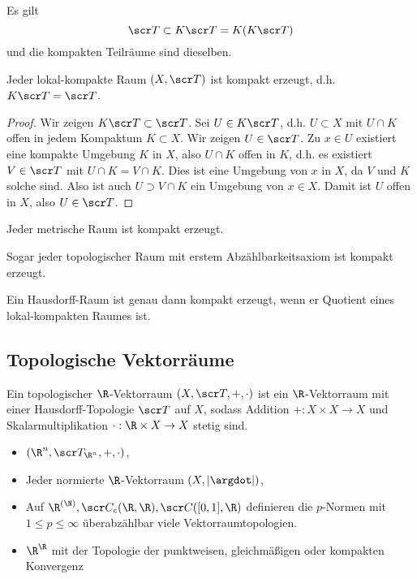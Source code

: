 \begin{lem}
	Es gilt
	\[
		\scr T \subset K \scr T = K(K \scr T)
	\]
	und die kompakten Teilräume sind dieselben.
\end{lem}

\begin{st}
	Jeder lokal-kompakte Raum $(X, \scr T)$ ist kompakt erzeugt, d.h. $K \scr T = \scr T$.
	\begin{proof}
		Wir zeigen $K \scr T \subset \scr T$.
		Sei $U \in K \scr T$, d.h. $U \subset X$ mit $U \cap K$ offen in jedem Kompaktum $K \subset X$.
		Wir zeigen $U \in \scr T$.
		Zu $x \in U$ existiert eine kompakte Umgebung $K$ in $X$, also $U \cap K$ offen in $K$, d.h. es existiert $V \in \scr T$ mit $U \cap K = V \cap K$.
		Dies ist eine Umgebung von $x$ in $X$, da $V$ und $K$ solche sind.
		Also ist auch $U \supset V \cap K$ ein Umgebung von $x \in X$.
		Damit ist $U$ offen in $X$, also $U \in \scr T$.
	\end{proof}
\end{st}


\begin{st}
	Jeder metrische Raum ist kompakt erzeugt.

	Sogar jeder topologischer Raum mit erstem Abzählbarkeitsaxiom ist kompakt erzeugt.
\end{st}

\begin{st}
	Ein Hausdorff-Raum ist genau dann kompakt erzeugt, wenn er Quotient eines lokal-kompakten Raumes ist.
\end{st}

\subsection{Topologische Vektorräume}

\begin{df}
	Ein topologischer $\R$-Vektorraum $(X, \scr T, +, \cdot)$ ist ein $\R$-Vektorraum mit einer Hausdorff-Topologie $\scr T$ auf $X$, sodass Addition $+: X\times X \to X$ und Skalarmultiplikation $\cdot: \R \times X \to X$ stetig sind.
\end{df}

\begin{ex}
	\begin{itemize}
		\item
			$(\R^n, \scr T_{\R^n}, +, \cdot)$,
		\item
			Jeder normierte $\R$-Vektorraum $(X,|\argdot|)$,
		\item
			Auf $\R^{(\N)}, \scr C_c(\R,\R), \scr C([0,1],\R)$ definieren die $p$-Normen mit $1 \le p \le \infty$ überabzählbar viele Vektorraumtopologien.
		\item
			$\R^\R$ mit der Topologie der punktweisen, gleichmäßigen oder kompakten Konvergenz
	\end{itemize}
\end{ex}

